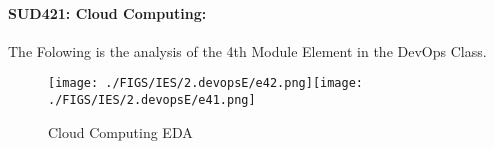 \documentclass[12pt]{extreport}
\begin{document}

\paragraph{\large SUD421: Cloud Computing:\\
}
The Folowing is the analysis of the 4th Module Element in the DevOps Class.

\begin{figure}[H]
	\centering
	\texttt{[image: ./FIGS/IES/2.devopsE/e42.png]}\texttt{[image: ./FIGS/IES/2.devopsE/e41.png]}
	\caption{Cloud Computing EDA}
	\label{fig:24}
\end{figure}
\begin{comment}


\subparagraph{Interpretation of the Box-plots:}
The numbers Below and the boxplots above show that also in this element  TSI students performance is slightly better than PSI students and half of the MP Students.
\begin{enumerate}	
	\item The MP Class Box-Plot:
	\begin{enumerate}
		\item MAX = 18 {} {} {} {} {} {} {} {} UQ = 16 {} {} {} {} {} {} {} {} Median = 15
		\item LQ = 14 {} {} {} {} {} {} {} {}  MIN = 11	 {} {} {} {} {} {} {} {}  IQR = 16 - 14 = 2
	\end{enumerate}
	\item The PSI Class Box-Plot:
	\begin{enumerate}
		\item MAX = 17 {} {} {} {} {} {} {} {} UQ = 16  {} {} {} {} {} {} {} {} Median = 15
		\item LQ = 13.5 {} {} {} {} {} {} {} {}  MIN = 11 {} {} {} {} {} {} {} {} IQR = 16 - 13.5 = 2.5	
	\end{enumerate}
	\item The TSI Class Box-Plot:
	\begin{enumerate}
		\item MAX = 17 {} {} {} {} {} {} {} {} UQ = 16  {} {} {} {} {} {} {} {} Median = 15
		\item LQ = 14 {} {} {} {} {} {} {} {} MIN = 13.5  {} {} {} {} {} {} {} {} IQR = 16 - 14 = 2	
	\end{enumerate}
\end{enumerate}

\subparagraph{Interpretation of the histogram:}
This Frequency Distribution is (Skeness) with the following descriptive statistics:

\begin{enumerate}
	\item Mean = 14.68
	\item STD = 1.93
	\item Range = 18 - 11 = 7
	\item IQR = 16 - 14 = 2
\end{enumerate}

\end{comment}
\end{document}
